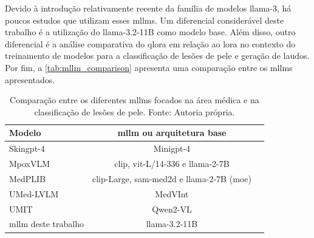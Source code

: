 Devido à introdução relativamente recente da família de modelos \ac{llama}-3, há poucos estudos que utilizam esses
\acp{mllm}. Um diferencial considerável deste trabalho é a utilização do \ac{llama}-3.2-11B como modelo base. Além
disso, outro diferencial é a análise comparativa do \ac{qlora} em relação ao \ac{lora} no contexto do treinamento de
modelos para a classificação de lesões de pele e geração de laudos. Por fim, a \autoref{tab:mllm_comparison} apresenta
uma comparação entre os \acp{mllm} apresentados.

\clearpage

\begin{table}[ht]
    \centering
    \begin{tabular}{l|cc}
        \hline
        Modelo                   & \ac{mllm} ou arquitetura base                                \\ \hline
        Skin\ac{gpt}-4           & Mini\ac{gpt}-4                                               \\
        MpoxVLM                  & \ac{clip}, \ac{vit}-L/14-336 e \ac{llama}-2-7B               \\
        MedPLIB                  & \ac{clip}-Large, \ac{sam-med2d} e \ac{llama}-2-7B (\ac{moe}) \\
        UMed-LVLM                & MedVInt                                                      \\
        UMIT                     & Qwen2-VL                                                     \\
        \ac{mllm} deste trabalho & \ac{llama}-3.2-11B                                           \\ \hline
    \end{tabular}
    \label{tab:mllm_comparison}
    \caption{Comparação entre os diferentes \acp{mllm} focados na área médica e na classificação de lesões de
    pele. Fonte: Autoria própria.}
\end{table}
